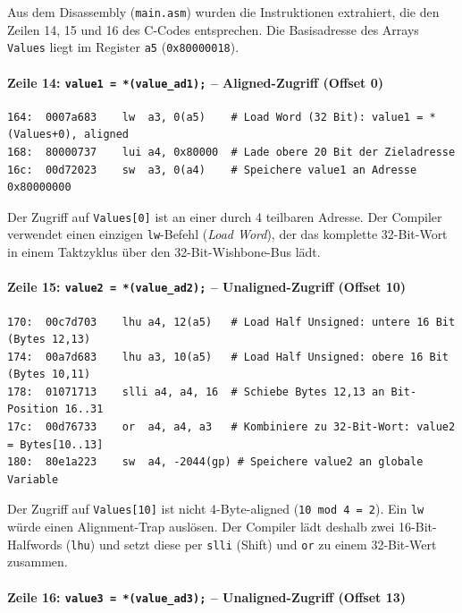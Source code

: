 Aus dem Disassembly (\texttt{main.asm}) wurden die Instruktionen extrahiert, die den Zeilen 14, 15 und 16 des C-Codes entsprechen. Die Basisadresse des Arrays \texttt{Values} liegt im Register \texttt{a5} (\texttt{0x80000018}).

\paragraph{Zeile 14: \texttt{value1 = *(value\_ad1);} -- Aligned-Zugriff (Offset 0)}

\begin{verbatim}
164:  0007a683    lw  a3, 0(a5)    # Load Word (32 Bit): value1 = *(Values+0), aligned
168:  80000737    lui a4, 0x80000  # Lade obere 20 Bit der Zieladresse
16c:  00d72023    sw  a3, 0(a4)    # Speichere value1 an Adresse 0x80000000
\end{verbatim}

Der Zugriff auf \texttt{Values[0]} ist an einer durch 4 teilbaren Adresse. Der Compiler verwendet einen einzigen \texttt{lw}-Befehl (\emph{Load Word}), der das komplette 32-Bit-Wort in einem Taktzyklus über den 32-Bit-Wishbone-Bus lädt.

\paragraph{Zeile 15: \texttt{value2 = *(value\_ad2);} -- Unaligned-Zugriff (Offset 10)}

\begin{verbatim}
170:  00c7d703    lhu a4, 12(a5)   # Load Half Unsigned: untere 16 Bit (Bytes 12,13)
174:  00a7d683    lhu a3, 10(a5)   # Load Half Unsigned: obere 16 Bit (Bytes 10,11)
178:  01071713    slli a4, a4, 16  # Schiebe Bytes 12,13 an Bit-Position 16..31
17c:  00d76733    or  a4, a4, a3   # Kombiniere zu 32-Bit-Wort: value2 = Bytes[10..13]
180:  80e1a223    sw  a4, -2044(gp) # Speichere value2 an globale Variable
\end{verbatim}

Der Zugriff auf \texttt{Values[10]} ist nicht 4-Byte-aligned (\texttt{10 mod 4 = 2}). Ein \texttt{lw} würde einen Alignment-Trap auslösen. Der Compiler lädt deshalb zwei 16-Bit-Halfwords (\texttt{lhu}) und setzt diese per \texttt{slli} (Shift) und \texttt{or} zu einem 32-Bit-Wert zusammen.

\paragraph{Zeile 16: \texttt{value3 = *(value\_ad3);} -- Unaligned-Zugriff (Offset 13)}

